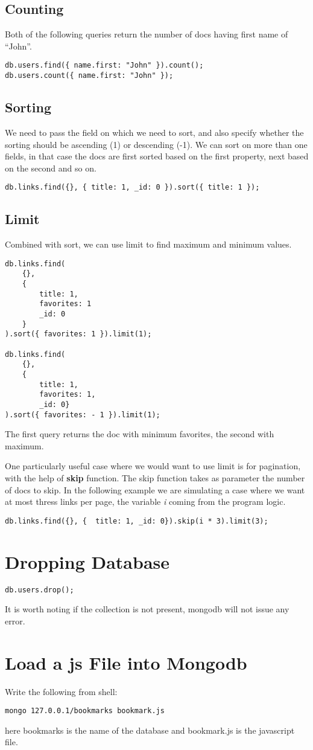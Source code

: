 \documentclass[a4paper, 12pt]{article}
\begin{document}
\subsection{Counting}
Both of the following queries return the number of docs having first name of ``John''.
\begin{verbatim}
db.users.find({ name.first: "John" }).count();
db.users.count({ name.first: "John" });
\end{verbatim}
\subsection{Sorting}
We need to pass the field on which we need to sort, and also specify whether the sorting should be ascending (1) or descending (-1). We can sort on more than one fields, in that case the docs are first sorted based on the first property, next based on the second and so on.
\begin{verbatim}
db.links.find({}, { title: 1, _id: 0 }).sort({ title: 1 });
\end{verbatim}
\subsection{Limit}
Combined with sort, we can use limit to find maximum and minimum values.
\begin{verbatim}
db.links.find(
	{},
	{
		title: 1,
		favorites: 1
		_id: 0
	}
).sort({ favorites: 1 }).limit(1);

db.links.find(
	{},
	{
		title: 1,
		favorites: 1,
		_id: 0}
).sort({ favorites: - 1 }).limit(1);
\end{verbatim}
The first query returns the doc with minimum favorites, the second with maximum.

One particularly useful case where we would want to use limit is for pagination, with the help of \textbf{skip} function. The skip function takes as parameter the number of docs to skip. In the following example we are simulating a case where we want at most thress links per page, the variable \emph{i} coming from the program logic.
\begin{verbatim}
db.links.find({}, {  title: 1, _id: 0}).skip(i * 3).limit(3);
\end{verbatim}

\section{Dropping Database}
\begin{verbatim}
db.users.drop();
\end{verbatim}
It is worth noting if the collection is not present, mongodb will not issue any error.

\section{Load a js File into Mongodb}
Write the following from shell:
\begin{verbatim}
mongo 127.0.0.1/bookmarks bookmark.js
\end{verbatim}
here bookmarks is the name of the database and bookmark.js is the javascript file.
\end{document}
